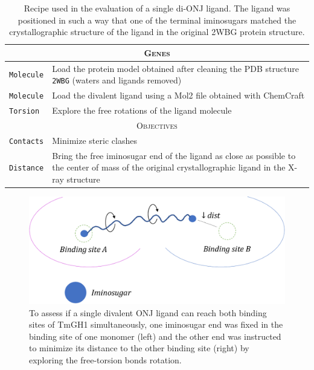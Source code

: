 \begin{table}[hbtp]
	\caption[Single di-ONJ recipe]{Recipe used in the evaluation of a single di-ONJ ligand. The ligand was positioned in such a way that one of the terminal iminosugars matched the crystallographic structure of the ligand in the original 2WBG protein structure.}
	\label{table:recipe-single-divalent}
	\footnotesize
	\newcommand{\tableheading}[1]{\multicolumn{2}{c}{\textsc{#1}}}
	\begin{tabularx}{\textwidth}{RL}
		\toprule
		\tableheading{Genes}\\
		\toprule
		\texttt{Molecule} & Load the protein model obtained after cleaning the PDB structure \texttt{2WBG} (waters and ligands removed) \\
		\midrule
		\texttt{Molecule} & Load the divalent ligand using a Mol2 file obtained with ChemCraft \\
		\midrule
		\texttt{Torsion} & Explore the free rotations of the ligand molecule \\
		\toprule
		\tableheading{Objectives}\\
		\toprule
		\texttt{Contacts} & Minimize steric clashes \\
		\midrule
		\texttt{Distance} & Bring the free iminosugar end of the ligand as close as possible to the center of mass of the original crystallographic ligand in the X-ray structure\cite{pdb:2wbg} \\

		\bottomrule

	\end{tabularx}
\end{table}


\begin{figure}[hbtp] %
	\begin{Center}
		\includegraphics[width=\textwidth]{./figures/06/one-divalent-stretch-crop.pdf}
	\end{Center}
	\caption[Single di-ONJ inhibitor test]{To assess if a single divalent ONJ ligand can reach both binding sites of TmGH1 simultaneously, one iminosugar end was fixed in the binding site of one monomer (left) and the other end was instructed to minimize its distance to the other binding site (right) by exploring the free-torsion bonds rotation.}
	\label{fig:one-divalent-stretch}
\end{figure}



